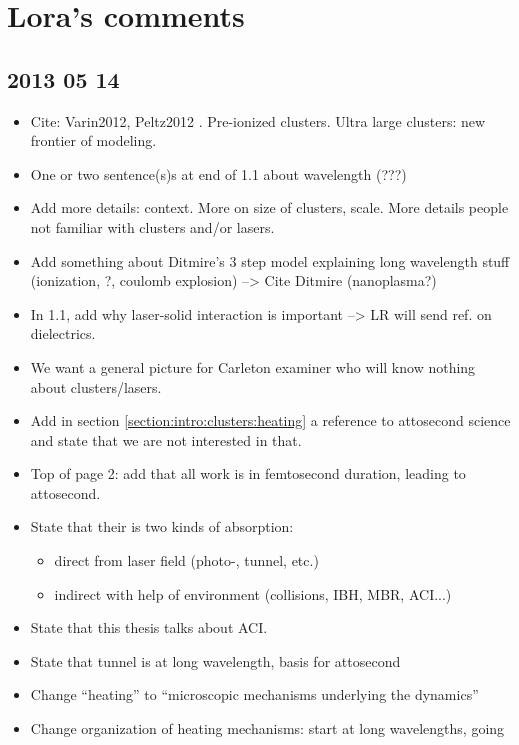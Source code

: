 \section*{Lora's comments}

\subsection*{2013 05 14}

\begin{itemize}
\item Cite: Varin2012, Peltz2012 \cite{Varin2012} \cite{Peltz2012}. Pre-ionized
clusters. Ultra large clusters: new frontier of modeling.
\item One or two sentence(s)s at end of 1.1 about wavelength (???)
\item Add more details: context. More on size of clusters, scale. More details
people not familiar with clusters and/or lasers.
\item Add something about Ditmire's 3 step model explaining long wavelength stuff
(ionization, ?, coulomb explosion) --> Cite Ditmire (nanoplasma?)
\item In 1.1, add why laser-solid interaction is important --> LR will send ref.
on dielectrics.
\item We want a general picture for Carleton examiner who will know nothing about
clusters/lasers.
\item Add in section \ref{section:intro:clusters:heating} a reference to
attosecond science and state that we are not interested in that.
\item Top of page 2: add that all work is in femtosecond duration, leading to
attosecond.
\item State that their is two kinds of absorption:
    \begin{itemize}
    \item direct from laser field (photo-, tunnel, etc.)
    \item indirect with help of environment (collisions, IBH, MBR, ACI...)
    \end{itemize}
\item State that this thesis talks about ACI.
\item State that tunnel is at long wavelength, basis for attosecond
\item Change ``heating'' to ``microscopic mechanisms underlying the dynamics''
\item Change organization of heating mechanisms: start at long wavelengths, going

\end{itemize}
